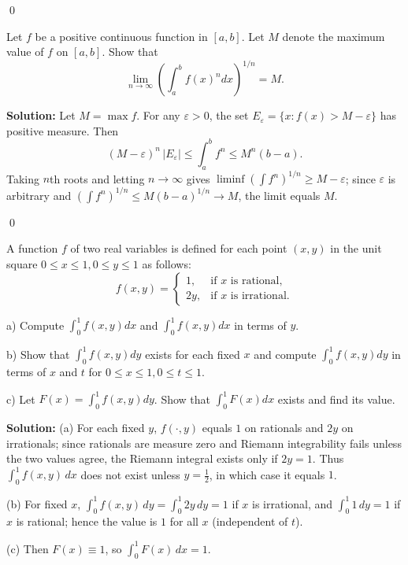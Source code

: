 \qed
\begin{problembox}
Let $f$ be a positive continuous function in $[a, b]$. Let $M$ denote the maximum value of $f$ on $[a, b]$. Show that
\[\lim_{n \to \infty} \left( \int_{a}^{b} f(x)^{n} dx \right)^{1/n} = M.\]
\end{problembox}

\noindent\textbf{Solution:}
Let $M=\max f$. For any $\varepsilon>0$, the set $E_\varepsilon=\{x:f(x)>M-\varepsilon\}$ has positive measure. Then
\[(M-\varepsilon)^n\,|E_\varepsilon|\le \int_a^b f^n\le M^n(b-a).
\]
Taking $n$th roots and letting $n\to\infty$ gives $\liminf (\int f^n)^{1/n}\ge M-\varepsilon$; since $\varepsilon$ is arbitrary and $(\int f^n)^{1/n}\le M(b-a)^{1/n}\to M$, the limit equals $M$.




\qed
\begin{problembox}
A function $f$ of two real variables is defined for each point $(x, y)$ in the unit square $0 \leq x \leq 1, 0 \leq y \leq 1$ as follows:
\[f(x, y) = 
\begin{cases}
1, & \text{if } x \text{ is rational}, \\
2y, & \text{if } x \text{ is irrational}.
\end{cases}\]

a) Compute $\int_{0}^{1} f(x, y) dx$ and $\int_{0}^{1} f(x, y) dx$ in terms of $y$.

b) Show that $\int_{0}^{1} f(x, y) dy$ exists for each fixed $x$ and compute $\int_{0}^{1} f(x, y) dy$ in terms of $x$ and $t$ for $0 \leq x \leq 1, 0 \leq t \leq 1$.

c) Let $F(x) = \int_{0}^{1} f(x, y) dy$. Show that $\int_{0}^{1} F(x) dx$ exists and find its value.
\end{problembox}

\noindent\textbf{Solution:}
(a) For each fixed $y$, $f(\cdot,y)$ equals $1$ on rationals and $2y$ on irrationals; since rationals are measure zero and Riemann integrability fails unless the two values agree, the Riemann integral exists only if $2y=1$. Thus $\int_0^1 f(x,y)\,dx$ does not exist unless $y=\tfrac12$, in which case it equals $1$.

(b) For fixed $x$, $\int_0^1 f(x,y)\,dy=\int_0^1 2y\,dy=1$ if $x$ is irrational, and $\int_0^1 1\,dy=1$ if $x$ is rational; hence the value is $1$ for all $x$ (independent of $t$).

(c) Then $F(x)\equiv 1$, so $\int_0^1 F(x)\,dx=1$.




